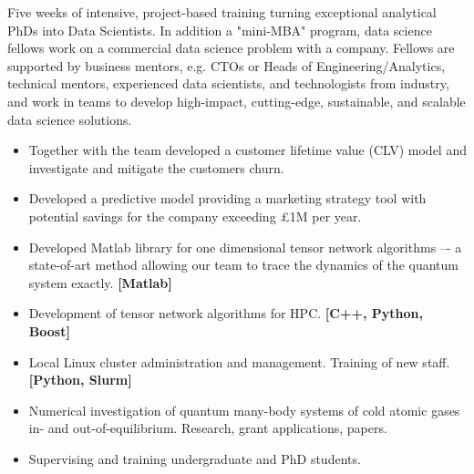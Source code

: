 \documentclass[10pt,a4paper,ragged2e,withhyper]{altacv}
\begin{document}
\divider

 
Five weeks of intensive, project-based training turning exceptional analytical
PhDs into Data Scientists.
In addition a "mini-MBA" program, data science fellows work on a commercial
data science problem with a company.
Fellows are supported by business mentors, e.g. CTOs or Heads of
Engineering/Analytics, technical mentors, experienced data scientists,
and technologists from industry, and work in teams to develop high-impact,
cutting-edge, sustainable, and scalable data science solutions.

\begin{itemize}

    \item
    Together with the team developed a customer lifetime value (CLV) model and investigate
    and mitigate the customers churn.
    
    \item
    Developed a predictive model providing a marketing strategy tool with potential
    savings for the company exceeding £1M per year.

\end{itemize}

\divider


\begin{itemize}

    \item
    Developed Matlab library for one dimensional tensor network algorithms –-
    a state-of-art method allowing our team to trace the dynamics of the
    quantum system exactly.
    {\bf [Matlab]}
    
    \item
    Development of tensor network algorithms for HPC.
    {\bf [C++, Python, Boost]}
    
    \item
    Local Linux cluster administration and management.
    Training of new staff.
    {\bf [Python, Slurm]}
    
    \item
    Numerical investigation of quantum many-body systems of cold atomic gases
    in- and out-of-equilibrium.
    Research, grant applications, papers.

    \item
    Supervising and training undergraduate and PhD students.

\end{itemize}
\end{document}
